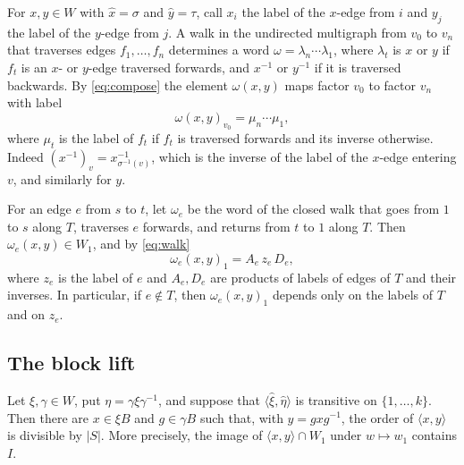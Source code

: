 \documentclass[11pt,colorlinks]{charlie}
\newcommand{\gen}[1]{\langle #1\rangle}
\begin{document}
For $x,y\in W$ with $\hat x=\sigma$ and $\hat y=\tau$, call $x_i$ the label of the $x$-edge from $i$ and $y_j$ the label of the $y$-edge from $j$. A walk in the undirected multigraph from $v_0$ to $v_n$ that traverses edges $f_1,\dots,f_n$ determines a word $\omega=\lambda_n\cdots\lambda_1$, where $\lambda_t$ is $x$ or $y$ if $f_t$ is an $x$- or $y$-edge traversed forwards, and $x^{-1}$ or $y^{-1}$ if it is traversed backwards. By \eqref{eq:compose} the element $\omega(x,y)$ maps factor $v_0$ to factor $v_n$ with label
\begin{equation}\label{eq:walk}
 \omega(x,y)_{v_0}=\mu_n\cdots\mu_1,
\end{equation}
where $\mu_t$ is the label of $f_t$ if $f_t$ is traversed forwards and its inverse otherwise. Indeed $(x^{-1})_{v}=x_{\sigma^{-1}(v)}^{-1}$, which is the inverse of the label of the $x$-edge entering $v$, and similarly for $y$.

For an edge $e$ from $s$ to $t$, let $\omega_e$ be the word of the closed walk that goes from $1$ to $s$ along $T$, traverses $e$ forwards, and returns from $t$ to $1$ along $T$. Then $\omega_e(x,y)\in W_1$, and by \eqref{eq:walk}
\begin{equation}\label{eq:walk-label}
 \omega_e(x,y)_1=A_e\,z_e\,D_e,
\end{equation}
where $z_e$ is the label of $e$ and $A_e,D_e$ are products of labels of edges of $T$ and their inverses. In particular, if $e\notin T$, then $\omega_e(x,y)_1$ depends only on the labels of $T$ and on $z_e$.

\subsection{The block lift}

\begin{proposition}\label{prop:wreath}
Let $\xi,\gamma\in W$, put $\eta=\gamma\xi\gamma^{-1}$, and suppose that $\gen{\hat\xi,\hat\eta}$ is transitive on $\{1,\dots,k\}$. Then there are $x\in\xi B$ and $g\in\gamma B$ such that, with $y=gxg^{-1}$, the order of $\gen{x,y}$ is divisible by $|S|$. More precisely, the image of $\gen{x,y}\cap W_1$ under $w\mapsto w_1$ contains $I$.
\end{proposition}
\end{document}
